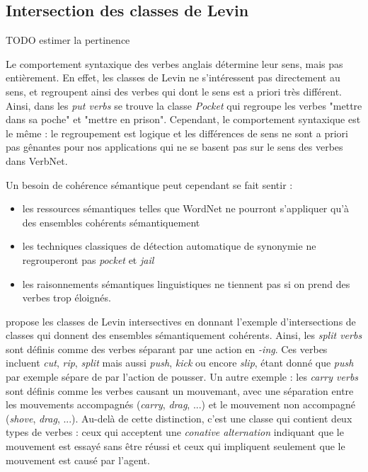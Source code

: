 \subsection{Intersection des classes de Levin}

TODO estimer la pertinence

Le comportement syntaxique des verbes anglais détermine leur sens, mais pas entièrement. En effet, les classes de Levin ne s'intéressent pas directement au sens, et regroupent ainsi des verbes qui dont le sens est a priori très différent. Ainsi, dans les \textit{put verbs} se trouve la classe \textit{Pocket} qui regroupe les verbes "mettre dans sa poche" et "mettre en prison". Cependant, le comportement syntaxique est le même : le regroupement est logique et les différences de sens ne sont a priori pas gênantes pour nos applications qui ne se basent pas sur le sens des verbes dans VerbNet.

Un besoin de cohérence sémantique peut cependant se fait sentir :
\begin{itemize}
    \item les ressources sémantiques telles que WordNet ne pourront s'appliquer qu'à des ensembles cohérents sémantiquement
    \item les techniques classiques de détection automatique de synonymie ne regrouperont pas \textit{pocket} et \textit{jail}
    \item les raisonnements sémantiques linguistiques ne tiennent pas si on prend des verbes trop éloignés.
\end{itemize}

\cite{dang1998investigating} propose les classes de Levin intersectives en donnant l'exemple d'intersections de classes qui donnent des ensembles sémantiquement cohérents. Ainsi, les \textit{split verbs} sont définis comme des verbes séparant par une action en \textit{-ing}. Ces verbes incluent \textit{cut}, \textit{rip}, \textit{split} mais aussi \textit{push}, \textit{kick} ou encore \textit{slip}, étant donné que \textit{push} par exemple sépare de par l'action de pousser. Un autre exemple : les \textit{carry verbs} sont définis comme les verbes causant un mouvemant, avec une séparation entre les mouvements accompagnés (\textit{carry}, \textit{drag}, ...) et le mouvement non accompagné (\textit{shove}, \textit{drag}, ...). Au-delà de cette distinction, c'est une classe qui contient deux types de verbes : ceux qui acceptent une \textit{conative alternation} indiquant que le mouvement est essayé sans être réussi et ceux qui impliquent seulement que le mouvement est causé par l'agent.

